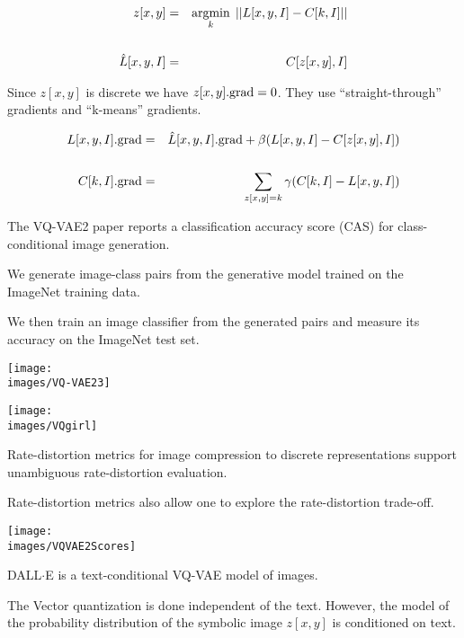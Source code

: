 {


{\huge
\begin{eqnarray*}
z[x,y] & = & \operatorname*{argmin}_k \;||L[x,y,I] - C[k,I]|| \\
\\
\hat{L}[x,y,I] & = & C[z[x,y],I]
\end{eqnarray*}
}

Since $z[x,y]$ is discrete we have $z[x,y].\mathrm{grad} = 0$.
They use ``straight-through'' gradients and ``k-means'' gradients.

{\huge
\begin{eqnarray*}
L[x,y,I].\mathrm{grad} & = & \hat{L}[x,y,I].\mathrm{grad} + \beta(L[x,y,I] - C[z[x,y],I]) \\
\\
C[k,I].\mathrm{grad} & = & \sum_{z[x,y]=k} \gamma(C[k,I] - L[x,y,I])
\end{eqnarray*}
}


The VQ-VAE2 paper reports a classification accuracy score (CAS) for class-conditional image generation.

\vfill
We generate image-class pairs from the generative model trained on the ImageNet training data.

\vfill
We then train an image classifier from the generated pairs and measure its accuracy on the ImageNet test set.

\vfill
\centerline{\texttt{[image: \\images/VQ-VAE23]}}


\vfill
\centerline{\texttt{[image: \\images/VQgirl]}}


Rate-distortion metrics for image compression to discrete representations support unambiguous rate-distortion evaluation.

\vfill
Rate-distortion metrics also allow one to explore the rate-distortion trade-off.

\vfill
\centerline{\texttt{[image: \\images/VQVAE2Scores]}}

\vfill
DALL$\cdot$E is a text-conditional VQ-VAE model of images.

\vfill
The Vector quantization is done independent of the text.  However, the model of the probability distribution of the symbolic image $z[x,y]$ is conditioned on text.

}
